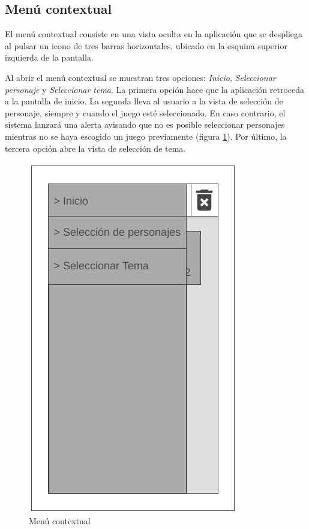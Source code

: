 \subsection{Menú contextual}
El menú contextual consiste en una vista oculta en la aplicación que se despliega al pulsar un icono de 
tres barras horizontales, ubicado en la esquina superior izquierda de la pantalla.\medskip

Al abrir el menú contextual se muestran tres opciones: \textit{Inicio}, \textit{Seleccionar personaje} y 
\textit{Seleccionar tema}. La primera opción hace que la aplicación retroceda a la pantalla de inicio.
La segunda lleva al usuario a la vista de selección de personaje, siempre y cuando el juego esté seleccionado. 
En caso contrario, el sistema lanzará una alerta avisando que no es posible seleccionar personajes mientras no 
se haya escogido un juego previamente (figura \ref*{MenuContextual}). Por último, la tercera opción abre la vista de 
selección de tema.

\begin{figure}[H]
    \centering
    \includegraphics[scale=0.3]{Figures/Mockups/Mock_Menu.png}
    \caption{Menú contextual}
    \label{MenuContextual}    
\end{figure}

